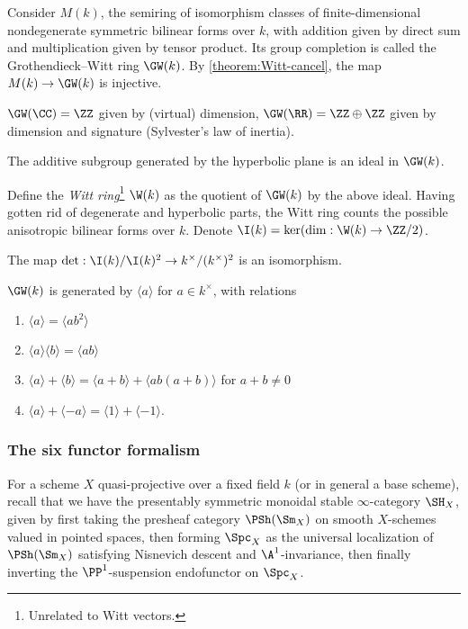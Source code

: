 Consider $M(k)$, the semiring of isomorphism classes of finite-dimensional nondegenerate symmetric bilinear forms over $k$, with addition given by direct sum and multiplication given by tensor product. Its group completion is called the Grothendieck--Witt ring $\GW(k)$. By \cref{theorem:Witt-cancel}, the map $M(k)\to \GW(k)$ is injective.

\begin{exm}
	$\GW(\CC)=\ZZ$ given by (virtual) dimension, $\GW(\RR)=\ZZ\oplus \ZZ$ given by dimension and signature (Sylvester's law of inertia).
\end{exm}

\begin{exr}
	The additive subgroup generated by the hyperbolic plane is an ideal in $\GW(k)$. 
\end{exr}

Define the \emph{Witt ring}\footnote{Unrelated to Witt vectors.} $\W(k)$ as the quotient of $\GW(k)$ by the above ideal. Having gotten rid of degenerate and hyperbolic parts, the Witt ring counts the possible anisotropic bilinear forms over $k$. Denote $\I(k)=\ker(\dim: \W(k)\to \ZZ/2)$.

\begin{proposition}[Milnor's conjecture for $n=1$]
The map $\det: \I(k)/\I(k)^2 \to k^\times/(k^\times)^2$ is an isomorphism.
\end{proposition} 

\begin{proposition}
	$\GW(k)$ is generated by $\langle a\rangle$ for $a\in k^\times$, with relations
	\begin{enumerate}
		\item $\langle a \rangle = \langle ab^2\rangle$
		\item $\langle a \rangle\langle b\rangle = \langle ab\rangle$
		\item $\langle a \rangle + \langle b \rangle = \langle a+b\rangle + \langle ab(a+b)\rangle$ for $a+b\neq 0$
		\item $\langle a\rangle + \langle -a\rangle = \langle 1\rangle + \langle -1 \rangle$.
	\end{enumerate}
\end{proposition}


\subsubsection{The six functor formalism}

For a scheme $X$ quasi-projective over a fixed field $k$ (or in general a base scheme), recall that we have the presentably symmetric monoidal stable $\infty$-category $\SH_X$, given by first taking the presheaf category $\PSh(\Sm_X)$ on smooth $X$-schemes valued in pointed spaces, then forming $\Spc_X$ as the universal localization of $\PSh(\Sm_X)$ satisfying Nisnevich descent and $\A^1$-invariance, then finally inverting the $\PP^1$-suspension endofunctor on $\Spc_X$. 

